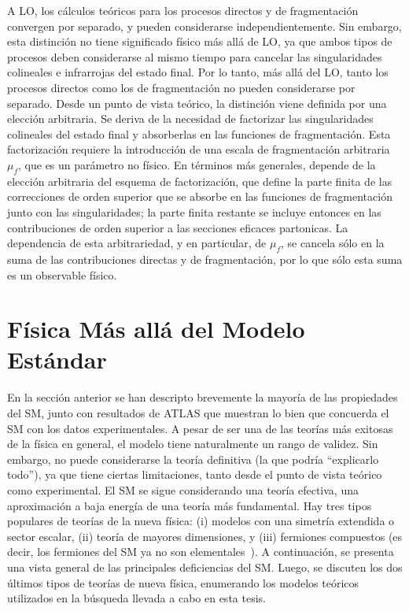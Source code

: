A \ac{LO}, los cálculos teóricos para los procesos directos y de fragmentación convergen por separado, y pueden considerarse independientemente. Sin embargo, esta distinción no tiene significado físico más allá de \ac{LO}, ya que ambos tipos de procesos deben considerarse al mismo tiempo para cancelar las singularidades colineales e infrarrojas del estado final. Por lo tanto, más allá del \ac{LO}, tanto los procesos directos como los de fragmentación no pueden considerarse por separado. Desde un punto de vista teórico, la distinción viene definida por una elección arbitraria. Se deriva de la necesidad de factorizar las singularidades colineales del estado final y absorberlas en las funciones de fragmentación. Esta factorización requiere la introducción de una escala de fragmentación arbitraria \(\mu_f\), que es un parámetro no físico. En términos más generales, depende de la elección arbitraria del esquema de factorización, que define la parte finita de las correcciones de orden superior que se absorbe en las funciones de fragmentación junto con las singularidades; la parte finita restante se incluye entonces en las contribuciones de orden superior a las secciones eficaces partonicas. La dependencia de esta arbitrariedad, y en particular, de \(\mu_f\), se cancela sólo en la suma de las contribuciones directas y de fragmentación, por lo que sólo esta suma es un observable físico.






\section{F\'isica M\'as all\'a del Modelo Est\'andar}
\label{sec:theory:bsm}

En la sección anterior se han descripto brevemente la mayoría de las propiedades del \ac{SM}, junto con resultados de \ac{ATLAS} que muestran lo bien que concuerda el \ac{SM} con los datos experimentales. A pesar de ser una de las teorías más exitosas de la física en general, el modelo tiene naturalmente un rango de validez.
Sin embargo, no puede considerarse la teoría definitiva (la que podría \enquote{explicarlo todo}), ya que tiene ciertas limitaciones, tanto desde el punto de vista teórico como experimental. El \ac{SM} se sigue considerando una teoría efectiva, una aproximación a baja energía de una teoría más fundamental. Hay tres tipos populares de teorías de la nueva física: (i) modelos con una simetría extendida o sector escalar, (ii) teoría de mayores dimensiones, y (iii) fermiones compuestos (es decir, los fermiones del \ac{SM} ya no son elementales~\cite{Kuhn_Zherwas-1984,Cabibbo_Maiani_Srivastava-1984,DeRújula_Maiani_Petronzio-1984,Baur_Spira_Zerwas-1990,Bhattacharya_Chauhan_Choudhary_Choudhury-2009,Zhan_Li_Liu_Li-2016}).
A continuación, se presenta una vista general de las principales deficiencias del \ac{SM}. Luego, se discuten los dos últimos tipos de teorías de nueva física, enumerando los modelos teóricos utilizados en la búsqueda llevada a cabo en esta tesis.

